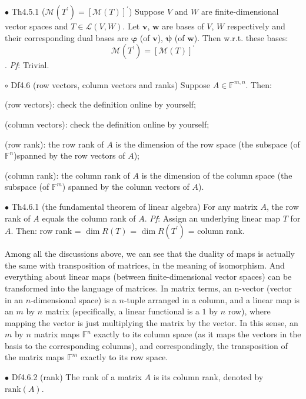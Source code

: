 \documentclass{article}
\begin{document}
\begin{Th}{$\bullet$ Th4.5.1 ($\mathcal{M}(T^\prime) = [\mathcal{M}(T)]^\prime$)}
    Suppose $V$ and $W$ are finite-dimensional vector spaces and $T\in\mathcal{L}(V, W)$. Let $\pmb{v}$, $\pmb{w}$ are bases of $V$, $W$ respectively and their corresponding dual bases are $\pmb{\varphi}$ (of $\pmb{v}$), $\pmb{\psi}$ (of $\pmb{w}$). Then w.r.t. these bases: 
    $$\mathcal{M}(T^\prime) = [\mathcal{M}(T)]^\prime$$.
    \tcblower
    \textit{Pf}: Trivial.
\end{Th}

\begin{Df}{$\circ$ Df4.6 (row vectors, column vectors and ranks)}
    Suppose $A\in\mathbb{F}^{m,n}$. Then:
    \begin{compactenum}
        \item (row vectors): check the definition online by yourself;
        \item (column vectors): check the definition online by yourself;
        \item (row rank): the row rank of $A$ is the dimension of the row space (the subspace (of $\mathbb{F}^n$)spanned by the row vectors of $A$);
        \item (column rank): the column rank of $A$ is the dimension of the column space (the subspace (of $\mathbb{F}^m$) spanned by the column vectors of $A$).
    \end{compactenum}
\end{Df}

\begin{Th}{$\bullet$ Th4.6.1 (the fundamental theorem of linear algebra)}
    For any matrix $A$, the row rank of $A$ equals the column rank of $A$.
    \tcblower
    \textit{Pf}: Assign an underlying linear map $T$ for $A$. Then: row rank = $\dim R(T)$ = $\dim R(T^\prime)$ = column rank.
\end{Th}

\begin{Rmk}{}
    Among all the discussions above, we can see that the duality of maps is actually the same with transposition of matrices, in the meaning of isomorphism. And everything about linear maps (between finite-dimensional vector spaces) can be transformed into the language of matrices. In matrix terms, an n-vector (vector in an $n$-dimensional space) is a $n$-tuple arranged in a column, and a linear map is an $m$ by $n$ matrix (specifically, a linear functional is a $1$ by $n$ row), where mapping the vector is just multiplying the matrix by the vector. In this sense, an $m$ by $n$ matrix maps $\mathbb{F}^n$ exactly to its column space (as it maps the vectors in the basis to the corresponding columns), and correspondingly, the transposition of the matrix maps $\mathbb{F}^m$ exactly to its row space.  
\end{Rmk}

\begin{Df}{$\bullet$ Df4.6.2 (rank)}
    The rank of a matrix $A$ is its column rank, denoted by $\text{rank}(A)$. 
\end{Df}
\end{document}
